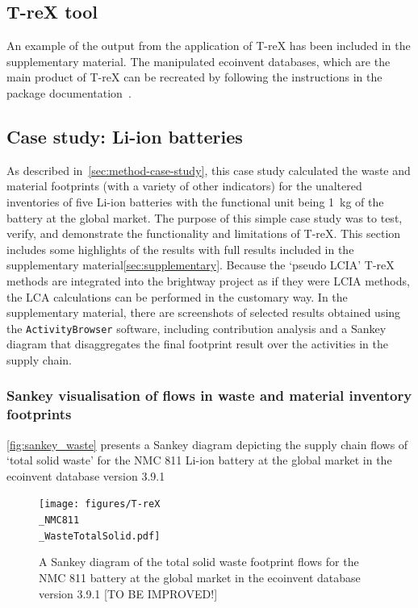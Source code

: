 \subsection{T-reX tool}\label{sec:results-T-reX}

An example of the output from the application of T-reX has been included in the supplementary material. The manipulated ecoinvent databases, which are the main product of T-reX can be recreated by following the instructions in the package documentation~\citep{mcdowall2023T-reXdocs}.

\subsection{Case study: Li-ion batteries}\label{sec:results-case_study}

As described in~\autoref{sec:method-case-study}, this case study calculated the waste and material footprints (with a variety of other indicators) for the unaltered inventories of five Li-ion batteries with the functional unit being 1~kg of the battery at the global market. The purpose of this simple case study was to test, verify, and demonstrate the functionality and limitations of T-reX. This section includes some highlights of the results with full results included in the supplementary material\autoref{sec:supplementary}. Because the `pseudo LCIA' T-reX methods are integrated into the brightway project as if they were LCIA methods, the LCA calculations can be performed in the customary way. In the supplementary material, there are screenshots of selected results obtained using the \texttt{ActivityBrowser} software, including contribution analysis and a Sankey diagram that disaggregates the final footprint result over the activities in the supply chain.

\subsubsection{Sankey visualisation of flows in waste and material inventory footprints}\label{sec:results-case_study-sankey}

\autoref{fig:sankey_waste} presents a Sankey diagram depicting the supply chain flows of `total solid waste' for the NMC 811 Li-ion battery at the global market in the ecoinvent database version 3.9.1

\begin{figure}[H]
    \centering
    \texttt{[image: figures/T-reX\\\_NMC811\\\_WasteTotalSolid.pdf]}
    \caption{A Sankey diagram of the total solid waste footprint flows for the NMC 811 battery at the global market in the ecoinvent database version 3.9.1 [TO BE IMPROVED!]}\label{fig:sankey_waste}
\end{figure}

